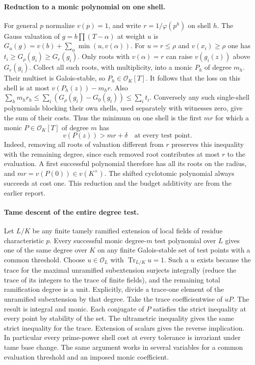 \paragraph{Reduction to a monic polynomial on one shell.}
For general $p$ normalize $v(p)=1$, and write $r=1/\varphi(p^h)$ on
shell $h$. The Gauss valuation of $g=b\prod(T-\alpha)$ at weight $u$
is $G_u(g)=v(b)+\sum_\alpha\min(u,v(\alpha))$. For $u=r\le\rho$ and
$v(x_i)\ge\rho$ one has $t_i\ge G_\rho(g_i)\ge G_r(g_i)$.
Only roots with $v(\alpha)=r$ can raise $v(g_i(z))$ above $G_r(g_i)$.
Collect all such roots, with multiplicity, into a monic $P_h$ of degree
$m_h$. Their multiset is Galois-stable, so $P_h\in\mathcal O_K[T]$.
It follows that the loss on this shell is at most $v(P_h(z))-m_hr$.
Also $\sum_h m_hr_h\le\sum_i(G_\rho(g_i)-G_0(g_i))\le\sum_i t_i$.
Conversely any such single-shell polynomials blocking their own shells,
used separately with witnesses zero, give the sum of their costs.
Thus the minimum on one shell is the first $mr$ for which a monic
$P\in\mathcal O_K[T]$ of degree $m$ has
\[
                      v(P(z))>mr+\delta\quad\text{at every test point}.
\]
Indeed, removing all roots of valuation different from $r$ preserves this
inequality with the remaining degree, since each removed root contributes
at most $r$ to the evaluation. A first successful polynomial therefore
has all its roots on the radius, and $mr=v(P(0))\in v(K^\times)$.
The shifted cyclotomic polynomial always succeeds at cost one.
This reduction and the budget additivity are from the earlier report.

\paragraph{Tame descent of the entire degree test.}
Let $L/K$ be any finite tamely ramified extension of local fields of residue
characteristic $p$. Every successful monic degree-$m$ test polynomial over
$L$ gives one of the same degree over $K$ on any finite Galois-stable set of
test points with a common threshold. Choose $u\in\mathcal O_L$ with
$\operatorname{Tr}_{L/K}u=1$. Such a $u$ exists because the trace for
the maximal unramified subextension surjects integrally (reduce the trace
of its integers to the trace of finite fields), and the remaining total
ramification degree is a unit. Explicitly, divide a trace-one element
of the unramified subextension by that degree. Take the trace
coefficientwise of $uP$. The result is integral and monic. Each conjugate of
$P$ satisfies the strict inequality at every point by stability of the set.
The ultrametric inequality gives the same strict inequality for the trace.
Extension of scalars gives the reverse implication. In particular every
prime-power shell cost at every tolerance is invariant under tame base
change. The same argument works in several variables for a common
evaluation threshold and an imposed monic coefficient.

